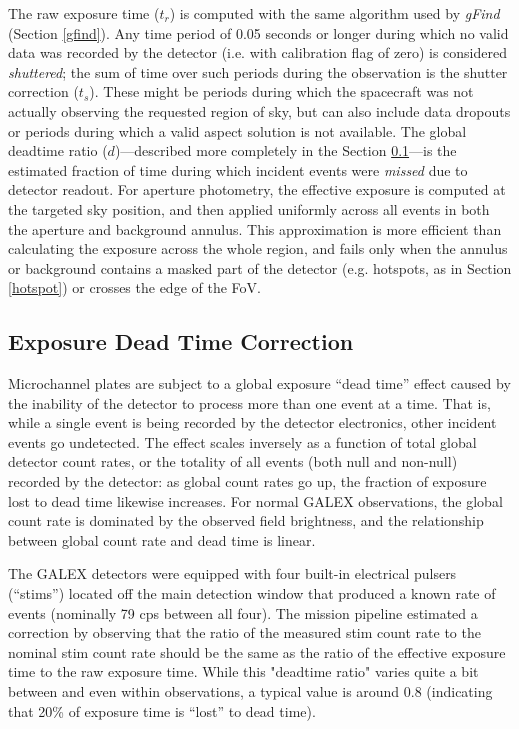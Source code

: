 \documentclass[preprint]{aastex}
\begin{document}
The raw exposure time ($t_r$) is computed with the same algorithm used by \emph{gFind} (Section \ref{gfind}). Any time period of 0.05 seconds or longer during which no valid data was recorded by the detector (i.e. with calibration flag of zero) is considered \emph{shuttered}; the sum of time over such periods during the observation is the shutter correction ($t_s$). These might be periods during which the spacecraft was not actually observing the requested region of sky, but can also include data dropouts or periods during which a valid aspect solution is not available. The global deadtime ratio ($d$)---described more completely in the Section \ref{deadtimedesc}---is the estimated fraction of time during which incident events were \emph{missed} due to detector readout. For aperture photometry, the effective exposure is computed at the targeted sky position, and then applied uniformly across all events in both the aperture and background annulus. This approximation is more efficient than calculating the exposure across the whole region, and fails only when the annulus or background contains a masked part of the detector (e.g. hotspots, as in Section \ref{hotspot}) or crosses the edge of the FoV.

\subsection{Exposure Dead Time Correction}
\label{deadtimedesc}
Microchannel plates are subject to a global exposure ``dead time'' effect caused by the inability of the detector to process more than one event at a time. That is, while a single event is being recorded by the detector electronics, other incident events go undetected. The effect scales inversely as a function of total global detector count rates, or the totality of all events (both null and non-null) recorded by the detector: as global count rates go up, the fraction of exposure lost to dead time likewise increases. For normal GALEX observations, the global count rate is dominated by the observed field brightness, and the relationship between global count rate and dead time is linear.

The GALEX detectors were equipped with four built-in electrical pulsers (``stims'') located off the main detection window that produced a known rate of events (nominally 79 cps between all four). The mission pipeline estimated a correction by observing that the ratio of the measured stim count rate to the nominal stim count rate should be the same as the ratio of the effective exposure time to the raw exposure time. While this "deadtime ratio" varies quite a bit between and even within observations, a typical value is around 0.8 (indicating that 20\% of exposure time is ``lost'' to dead time).
\end{document}
